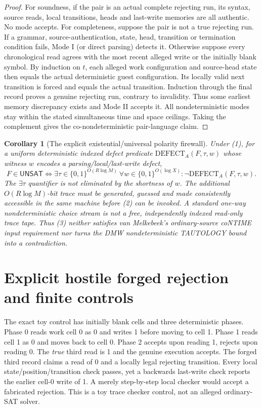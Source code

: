 \documentclass[11pt]{article}
\newtheorem{corollary}[theorem]{Corollary}
\newcommand{\UNSAT}{\mathsf{UNSAT}}
\begin{document}
\begin{proof}
For soundness, if the pair is an actual complete rejecting run, its syntax, source reads, local transitions, heads and last-write memories are all authentic. No mode accepts. For completeness, suppose the pair is not a true rejecting run. If a grammar, source-authentication, state, head, transition or termination condition fails, Mode I (or direct parsing) detects it. Otherwise suppose every chronological read agrees with the most recent alleged write or the initially blank symbol. By induction on $t$, each alleged work configuration and source-head state then equals the actual deterministic guest configuration. Its locally valid next transition is forced and equals the actual transition. Induction through the final record proves a genuine rejecting run, contrary to invalidity. Thus some earliest memory discrepancy exists and Mode II accepts it. All nondeterministic modes stay within the stated simultaneous time and space ceilings. Taking the complement gives the co-nondeterministic pair-language claim.
\end{proof}

\begin{corollary}[The explicit existential/universal polarity firewall]\label{cor:quant}
Under (1), for a uniform deterministic indexed defect predicate $\mathrm{DEFECT}_A(F,\tau,w)$ whose witness $w$ encodes a parsing/local/last-write defect,
\[
 F\in\UNSAT\iff
 \exists\tau\in\{0,1\}^{O(R\log M)}
 \ \forall w\in\{0,1\}^{O(\log X)}:
 \neg\mathrm{DEFECT}_A(F,\tau,w).
 \tag{3}
\]
The $\exists\tau$ quantifier is not eliminated by the shortness of $w$. The additional $O(R\log M)$-bit trace must be generated, guessed and made consistently accessible in the same machine before (2) can be invoked. A standard one-way nondeterministic choice stream is not a free, independently indexed read-only trace tape. Thus (3) neither satisfies van Melkebeek's ordinary-source coNTIME input requirement nor turns the DMW nondeterministic TAUTOLOGY bound into a contradiction.
\end{corollary}

\section{Explicit hostile forged rejection and finite controls}
The exact toy control has initially blank cells and three deterministic phases. Phase 0 reads work cell 0 as 0 and writes 1 before moving to cell 1. Phase 1 reads cell 1 as 0 and moves back to cell 0. Phase 2 accepts upon reading 1, rejects upon reading 0. The \emph{true} third read is 1 and the genuine execution accepts. The forged third record claims a read of 0 and a locally legal rejecting transition. Every local state/position/transition check passes, yet a backwards last-write check reports the earlier cell-0 write of 1. A merely step-by-step local checker would accept a fabricated rejection. This is a toy trace checker control, not an alleged ordinary-SAT solver.
\end{document}
